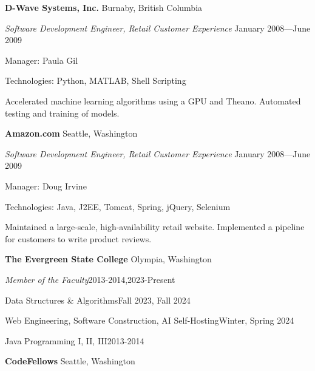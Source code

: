 \documentclass[letter]{article}
\begin{document}
\vspace{\baselineskip}
\par
{\bf {D-Wave Systems, Inc.}} \hfill Burnaby, British Columbia
\par
{\em Software Development Engineer, Retail Customer Experience} \hfill January 2008---June 2009
\par
Manager: Paula Gil
\vspace{0.5\baselineskip}
\par
Technologies: Python, MATLAB, Shell Scripting
\vspace{0.5\baselineskip}
\par
Accelerated machine learning algorithms using a GPU and Theano. Automated testing and training of models.

\vspace{\baselineskip}
\par
{\bf {Amazon.com}} \hfill Seattle, Washington
\par
{\em Software Development Engineer, Retail Customer Experience} \hfill January 2008---June 2009
\par
Manager: Doug Irvine
\vspace{0.5\baselineskip}
\par
Technologies: Java, J2EE, Tomcat, Spring, jQuery, Selenium
\vspace{0.5\baselineskip}
\par
Maintained a large-scale, high-availability
retail website. Implemented a pipeline for customers to write product reviews.


{\bf The Evergreen State College} \hfill Olympia, Washington

\par
{\em Member of the Faculty}\hfill 2013-2014,2023-Present

\vspace{0.5\baselineskip}
\par
Data Structures \& Algorithms\hfill Fall 2023, Fall 2024
\vspace{0.5\baselineskip}
\par
Web Engineering, Software Construction, AI Self-Hosting\hfill Winter, Spring 2024
\vspace{0.5\baselineskip}
\par
Java Programming I, II, III\hfill 2013-2014


{\bf CodeFellows} \hfill Seattle, Washington
\end{document}

